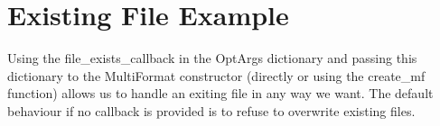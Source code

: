 \documentclass[a4paper]{report}
\begin{document}
\chapter{Existing File Example}

Using the file\_exists\_callback in the OptArgs dictionary and passing this dictionary to the MultiFormat constructor (directly or using the create\_mf function) allows us to handle an exiting file in any way we want. The default behaviour if no callback is provided is to refuse to overwrite existing files.
\end{document}
